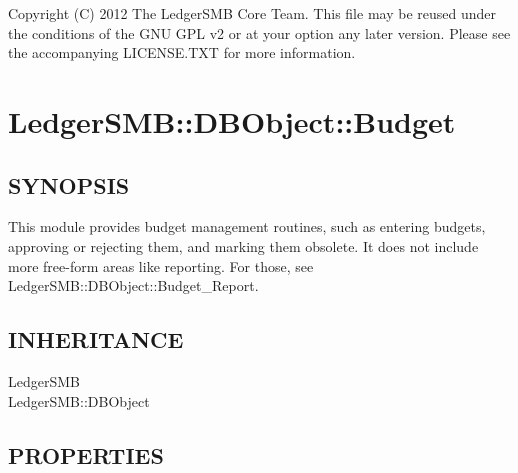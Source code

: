 \begin{description}
\begin{description}
\begin{description}
\begin{description}
\begin{description}
\begin{description}
\begin{description}
\begin{description}
\begin{description}
\begin{description}
Copyright (C) 2012 The LedgerSMB Core Team.  This file may be reused under the
conditions of the GNU GPL v2 or at your option any later version.  Please see the
accompanying LICENSE.TXT for more information.

\section{LedgerSMB::DBObject::Budget\label{LedgerSMB::DBObject::Budget}}




\subsection*{SYNOPSIS\label{LedgerSMB::DBObject::Budget_SYNOPSIS}}


This module provides budget management routines, such as entering budgets,
approving or rejecting them, and marking them obsolete.  It does not include
more free-form areas like reporting.  For those, see
LedgerSMB::DBObject::Budget\_Report.

\subsection*{INHERITANCE\label{LedgerSMB::DBObject::Budget_INHERITANCE}}
\begin{description}

\item[{LedgerSMB}] \mbox{}
\item[{LedgerSMB::DBObject}] \mbox{}\end{description}
\subsection*{PROPERTIES\label{LedgerSMB::DBObject::Budget_PROPERTIES}}
\begin{description}


\end{description}
\end{description}
\end{description}
\end{description}
\end{description}
\end{description}
\end{description}
\end{description}
\end{description}
\end{description}
\end{description}
